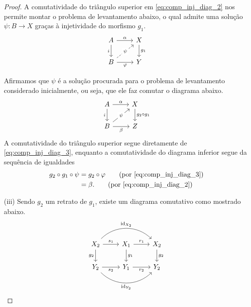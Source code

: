 \begin{proof}
  A comutatividade do triângulo superior em \eqref{eq:comp_inj_diag_2} nos permite montar o problema de levantamento abaixo, o qual admite uma solução $\psi: B \to X$ graças à injetividade do morfismo $g_1$.
  \begin{equation}\label{eq:comp_inj_diag_3}
    \begin{tikzcd}
      A
      \arrow[r, "\alpha"]
      \arrow[d, "i" swap]
      & X
      \arrow[d, "g_1"]
      \\ B
      \arrow[r, "\varphi" swap]
      \arrow[ru, dashed, "\psi" description]
      & Y
    \end{tikzcd}
  \end{equation}

  Afirmamos que $\psi$ é a solução procurada para o problema de levantamento considerado inicialmente, ou seja, que ele faz comutar o diagrama abaixo.
  \begin{displaymath}
    \begin{tikzcd}
      A
      \arrow[r, "\alpha"]
      \arrow[d, "i" swap]
      & X
      \arrow[d, "g_2 \circ g_1"]
      \\ B
      \arrow[r, "\beta" swap]
      \arrow[ru, "\psi" description]
      & Z
    \end{tikzcd}
  \end{displaymath}
  A comutatividade do triângulo superior segue diretamente de \eqref{eq:comp_inj_diag_3}, enquanto a comutatividade do diagrama inferior segue da sequência de igualdades
  \begin{align*}
    g_2 \circ g_1 \circ \psi
    & = g_2 \circ \varphi \tag{por \eqref{eq:comp_inj_diag_3}} \\
    & = \beta. \tag{por \eqref{eq:comp_inj_diag_2}}
  \end{align*}

  \smallskip
  (iii) Sendo $g_2$ um retrato de $g_1$, existe um diagrama comutativo como mostrado abaixo.
  \begin{equation}\label{eq:retracao_inj_diag_1}
    \begin{tikzcd}
      X_2
      \arrow[d, "g_2" swap]
      \arrow[r, "s_1"]
      \arrow[rr, bend left=45, "\id_{X_2}"]
      & X_1
      \arrow[r, "r_1"]
      \arrow[d, "g_1"]
      & X_2
      \arrow[d, "g_2"]
      \\ Y_2
      \arrow[r, "s_2" swap]
      \arrow[rr, bend right=45, "\id_{Y_2}" swap]
      & Y_1
      \arrow[r, "r_2" swap]
      & Y_2
    \end{tikzcd}
  \end{equation}


\end{proof}
